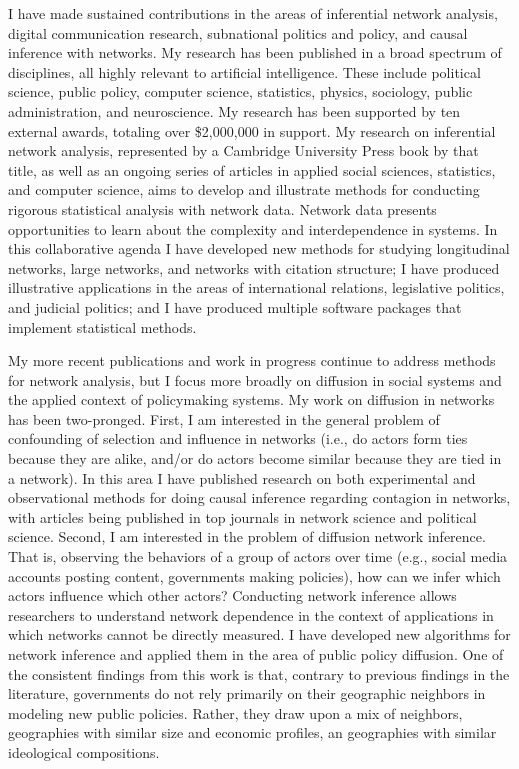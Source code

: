 \documentclass[a4paper]{article}
\begin{document}
I have made sustained contributions in the areas of inferential network analysis, digital communication research, subnational politics and policy, and causal inference with networks. My research has been published in a broad spectrum of disciplines, all highly relevant to artificial intelligence. These include political science, public policy, computer science, statistics, physics, sociology, public administration, and neuroscience. My research has been supported by ten external awards, totaling over \$2,000,000 in support. My research on inferential network analysis, represented by a Cambridge University Press book by that title, as well as an ongoing series of articles in applied social sciences, statistics, and computer science, aims to develop and illustrate methods for conducting rigorous statistical analysis with network data. Network data presents opportunities to learn about the complexity and interdependence in systems. In this collaborative agenda I have developed new methods for studying longitudinal networks, large networks, and networks with citation structure; I have produced illustrative applications in the areas of international relations, legislative politics, and judicial politics; and I have produced multiple software packages that implement statistical methods. 

My more recent publications and work in progress continue to address methods for network analysis, but I focus more broadly on diffusion in social systems and the applied context of policymaking systems. My work on diffusion in networks has been two-pronged. First, I am interested in the general problem of confounding of selection and influence in networks (i.e., do actors form ties because they are alike, and/or do actors become similar because they are tied in a network). In this area I have published research on both experimental and observational methods for doing causal inference regarding contagion in networks, with articles being published in top journals in network science and political science. Second, I am interested in the problem of diffusion network inference. That is, observing the behaviors of a group of actors over time (e.g., social media accounts posting content, governments making policies), how can we infer which actors influence which other actors? Conducting network inference allows researchers to understand network dependence in the context of applications in which networks cannot be directly measured. I have developed new algorithms for network inference and applied them in the area of public policy diffusion. One of the consistent findings from this work is that, contrary to previous findings in the literature, governments do not rely primarily on their geographic neighbors in modeling new public policies. Rather, they draw upon a mix of neighbors, geographies with similar size and economic profiles, an geographies with similar ideological compositions. 
\end{document}
